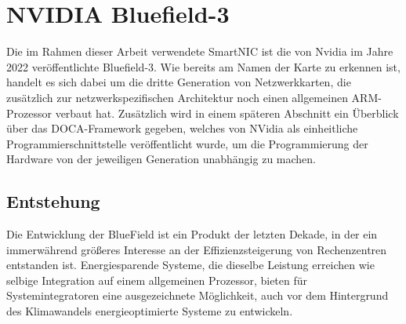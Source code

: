 %
%

\chapter{NVIDIA Bluefield-3}
\label{cha:design}
Die im Rahmen dieser Arbeit verwendete SmartNIC ist die von Nvidia im Jahre 2022 veröffentlichte Bluefield-3. Wie bereits am Namen der Karte zu erkennen ist, handelt es sich dabei um die dritte Generation von Netzwerkkarten, die zusätzlich zur netzwerkspezifischen Architektur noch einen allgemeinen ARM-Prozessor verbaut hat. Zusätzlich wird in einem späteren Abschnitt ein Überblick über das DOCA-Framework gegeben, welches von NVidia als einheitliche Programmierschnittstelle veröffentlicht wurde, um die Programmierung der Hardware von der jeweiligen Generation unabhängig zu machen.
\section{Entstehung}
Die Entwicklung der BlueField ist ein Produkt der letzten Dekade, in der ein immerwährend größeres Interesse an der Effizienzsteigerung von Rechenzentren entstanden ist. Energiesparende Systeme, die dieselbe Leistung erreichen wie selbige Integration auf einem allgemeinen Prozessor, bieten für Systemintegratoren eine ausgezeichnete Möglichkeit, auch vor dem Hintergrund des Klimawandels energieoptimierte Systeme zu entwickeln.
